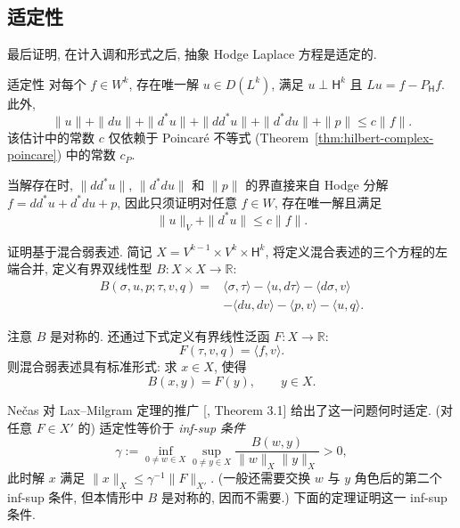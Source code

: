 \subsection{{适定性}}\label{subsec:hodge-well-posedness}

{最后证明, 在计入调和形式之后, 抽象 Hodge Laplace 方程是适定的.}


\begin{Theorem}{{适定性}}\label{thm:hodge-well-posedness}
{对每个 $f\in W^k$, 存在唯一解 $u\in D(L^k)$, 满足 $u\perp\mathsf H^k$ 且 $Lu=f-P_{\mathsf H}f$. 此外,}
\[
\|u\|+\|du\|+\|d^*u\|+\|dd^*u\|+\|d^*du\|+\|p\|\leq c\|f\|.
\]
{该估计中的常数 $c$ 仅依赖于 Poincaré 不等式 (Theorem~\ref{thm:hilbert-complex-poincare}) 中的常数 $c_P$.}
\end{Theorem}

\begin{Proof}
{当解存在时, $\|dd^*u\|$, $\|d^*du\|$ 和 $\|p\|$ 的界直接来自 Hodge 分解 $f=dd^*u+d^*du+p$, 因此只须证明对任意 $f\in W$, 存在唯一解且满足}
\[
\|u\|_V+\|d^*u\|\leq c\|f\|.
\]

{证明基于混合弱表述. 简记 $X=V^{k-1}\times V^k\times\mathsf H^k$, 将定义混合表述的三个方程的左端合并, 定义有界双线性型 $B:X\times X\to\mathbb R$:}
\begin{equation}\label{eq:hodge-mixed-bilinear-form}
\begin{aligned}
B(\sigma,u,p;\tau,v,q)={}&\langle\sigma,\tau\rangle-\langle u,d\tau\rangle-\langle d\sigma,v\rangle\\
&-\langle du,dv\rangle-\langle p,v\rangle-\langle u,q\rangle.
\end{aligned}
\end{equation}

{注意 $B$ 是对称的. 还通过下式定义有界线性泛函 $F:X\to\mathbb R$:}
\begin{equation}\label{eq:hodge-mixed-load-functional}
F(\tau,v,q)=\langle f,v\rangle.
\end{equation}
{则混合弱表述具有标准形式: 求 $x\in X$, 使得}
\begin{equation}\label{eq:hodge-mixed-abstract-problem}
B(x,y)=F(y),\qquad y\in X.
\end{equation}

{Nečas 对 Lax–Milgram 定理的推广 [, Theorem 3.1] 给出了这一问题何时适定. (对任意 $F\in X'$ 的) 适定性等价于 \emph{inf-sup 条件}}
\begin{equation}\label{eq:hodge-inf-sup-condition}
\gamma:=\inf_{0\ne w\in X}\sup_{0\ne y\in X}\frac{B(w,y)}{\|w\|_X\|y\|_X}>0,
\end{equation}
{此时解 $x$ 满足 $\|x\|_X\leq\gamma^{-1}\|F\|_{X'}$. (一般还需要交换 $w$ 与 $y$ 角色后的第二个 inf-sup 条件, 但本情形中 $B$ 是对称的, 因而不需要.) 下面的定理证明这一 inf-sup 条件.}
\end{Proof}

